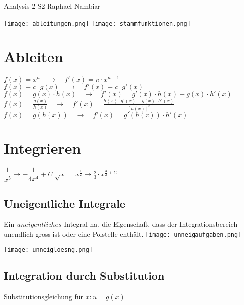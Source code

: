 



\begin{multicols*}{3}

    \DocumentInfo
    {Analysis 2 S2} %
    {Raphael Nambiar} %





    \texttt{[image: ableitungen.png]}
    \texttt{[image: stammfunktionen.png]}

    \section{ Ableiten }

    $f(x) = x^n \quad \rightarrow \quad f'(x) = n \cdot x^{n-1}$
    \WhiteSpace
    $f(x) = c \cdot g(x) \quad \rightarrow \quad f'(x) = c \cdot g'(x)$
    \WhiteSpace
    $f(x) = g(x) \cdot h(x) \quad \rightarrow \quad f'(x) = g'(x) \cdot h(x) + g(x) \cdot h'(x)$
    \WhiteSpace
    $f(x) = \frac{g(x)}{h(x)} \quad \rightarrow \quad f'(x)=\frac{h(x) \cdot g'(x) - g(x) \cdot h'(x)}{\left[h(x)\right]^2}$
    \WhiteSpace
    $f(x) = g(h(x)) \quad \rightarrow \quad f'(x) = g'(h(x)) \cdot h'(x)$
    \WhiteSpace
    \section{ Integrieren }
    \WhiteSpace
    {$\dfrac{1}{x^5} \rightarrow -\dfrac{1}{4x^4} + C$}
    \WhiteSpace
    \WhiteSpace
    {$\sqrt{x} = x^{\frac{1}{2}} \rightarrow \frac{2}{3}\cdot x^{\frac{3}{2} + C} $}
    \WhiteSpace
    \WhiteSpace


    \subsection{Uneigentliche Integrale}
    { Ein $uneigentliches$ Integral hat die Eigenschaft, dass der Integrationsbereich unendlich gross
        ist oder eine Polstelle enthält.}
    \texttt{[image: unneigaufgaben.png]}

    \texttt{[image: unneigloesng.png]}




    \subsection{Integration durch Substitution}
    { Substitutionsgleichung für $x: u = g(x)$}


\end{multicols*}
